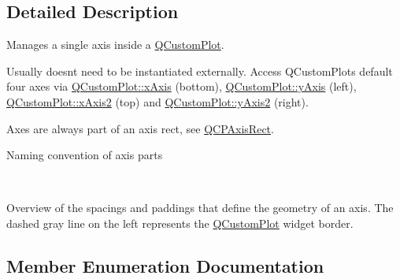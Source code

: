 \subsection{Detailed Description}
Manages a single axis inside a \hyperlink{classQCustomPlot}{Q\+Custom\+Plot}. 

Usually doesn\textquotesingle{}t need to be instantiated externally. Access Q\+Custom\+Plot\textquotesingle{}s default four axes via \hyperlink{classQCustomPlot_a9a79cd0158a4c7f30cbc702f0fd800e4}{Q\+Custom\+Plot\+::x\+Axis} (bottom), \hyperlink{classQCustomPlot_af6fea5679725b152c14facd920b19367}{Q\+Custom\+Plot\+::y\+Axis} (left), \hyperlink{classQCustomPlot_ada41599f22cad901c030f3dcbdd82fd9}{Q\+Custom\+Plot\+::x\+Axis2} (top) and \hyperlink{classQCustomPlot_af13fdc5bce7d0fabd640f13ba805c0b7}{Q\+Custom\+Plot\+::y\+Axis2} (right).

Axes are always part of an axis rect, see \hyperlink{classQCPAxisRect}{Q\+C\+P\+Axis\+Rect}.  \begin{center}Naming convention of axis parts\end{center}  ~\newline
  \begin{center}Overview of the spacings and paddings that define the geometry of an axis. The dashed gray line on the left represents the \hyperlink{classQCustomPlot}{Q\+Custom\+Plot} widget border.\end{center}  

\subsection{Member Enumeration Documentation}
